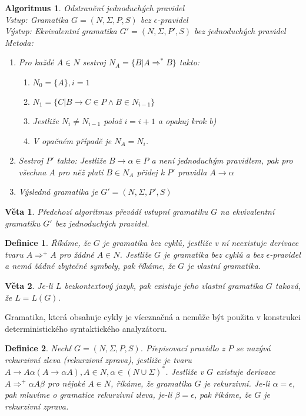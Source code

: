 \documentclass[a4paper, 11pt]{report}
\newtheorem{mydef}{Definice}[chapter]
\newtheorem{veta}{Věta}[chapter]
\newtheorem{alg}{Algoritmus}[chapter]
\begin{document}
\begin{alg}
Odstranění jednoduchých pravidel\\
Vstup: Gramatika $G = (N, \Sigma, P, S)$ bez $\epsilon$-pravidel\\
Výstup: Ekvivalentní gramatika $G' = (N, \Sigma, P', S)$ bez jednoduchých pravidel\\
Metoda:
\begin{enumerate}
	\item Pro každé $A \in N$ sestroj $N_A = \{ B | A \Rightarrow^* B \}$ takto:
	\begin{enumerate}
		\item $N_0 = \{A\}, i = 1$
		\item $N_1 = \{C | B \to C \in P \land B \in N_{i-1}\}$
		\item Jestliže $N_i \not= N_{i-1}$ polož $i = i + 1$ a opakuj krok b)
		\item V opačném případě je $N_A = N_i$.
	\end{enumerate}
	\item Sestroj $P'$ takto: Jestliže $B \to \alpha \in P$ a není jednoduchým pravidlem, pak pro všechna $A$ pro něž platí $B \in N_A$ přidej k $P'$ pravidla $A \to \alpha$
	\item Výsledná gramatika je $G' = (N, \Sigma, P', S)$
\end{enumerate}
\end{alg}

\begin{veta}
Předchozí algoritmus převádí vstupní gramatiku $G$ na ekvivalentní gramatiku $G'$ bez jednoduchých pravidel.
\end{veta}

\begin{mydef}
Říkáme, že $G$ je \emph{gramatika bez cyklů}, jestliže v ní neexistuje derivace tvaru $A \Rightarrow^+ A$ pro žádné $A \in N$. Jestliže $G$ je gramatika bez cyklů a bez $\epsilon$-pravidel a nemá žádné zbytečné symboly, pak říkáme, že $G$ je \emph{vlastní gramatika}.
\end{mydef}

\begin{veta}
Je-li $L$ bezkontextový jazyk, pak existuje jeho vlastní gramatika $G$ taková, že $L = L(G)$.
\end{veta}

Gramatika, která obsahuje cykly je víceznačná a nemůže být použita v konstrukci deterministického syntaktického analyzátoru.

\begin{mydef}
Nechť $G=(N, \Sigma, P, S)$. Přepisovací pravidlo z $P$ se nazývá \emph{rekurzivní zleva (rekurzivní zprava)}, jestliže je tvaru $A \to A \alpha (A \to \alpha A), A \in N, \alpha \in (N \cup \Sigma)^*$. Jestliže v $G$ existuje derivace $A \Rightarrow^+ \alpha A \beta$ pro nějaké $A \in N$, říkáme, že gramatika $G$ je rekurzivní. Je-li $\alpha = \epsilon$, pak mluvíme o \emph{gramatice rekurzivní zleva}, je-li $\beta = \epsilon$, pak říkáme, že $G$ je \emph{rekurzivní zprava}.
\end{mydef}
\end{document}
